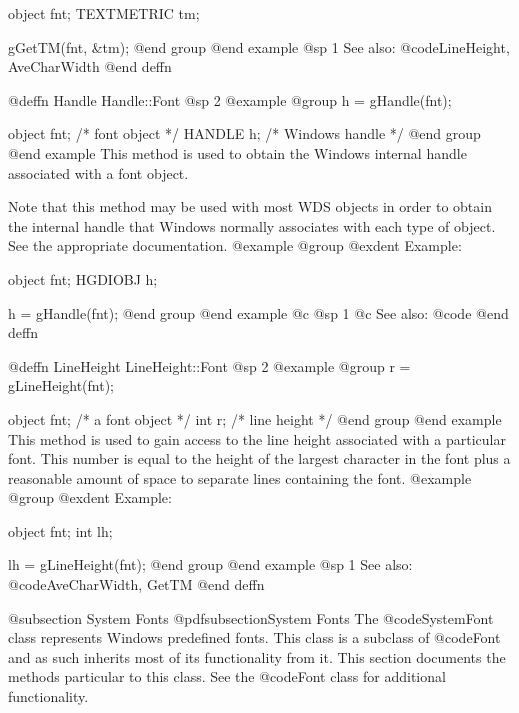 object  fnt;
TEXTMETRIC  tm;

gGetTM(fnt, &tm);
@end group
@end example
@sp 1
See also:  @code{LineHeight, AveCharWidth}
@end deffn













@deffn {Handle} Handle::Font
@sp 2
@example
@group
h = gHandle(fnt);

object  fnt;    /*  font object     */
HANDLE  h;      /*  Windows handle  */
@end group
@end example
This method is used to obtain the Windows internal handle associated with
a font object.  

Note that this method may be used with most WDS objects in order to obtain
the internal handle that Windows normally associates with each type of object.
See the appropriate documentation.
@example
@group
@exdent Example:

object  fnt;
HGDIOBJ h;

h = gHandle(fnt);
@end group
@end example
@c @sp 1
@c See also:  @code{}
@end deffn














@deffn {LineHeight} LineHeight::Font
@sp 2
@example
@group
r = gLineHeight(fnt);

object   fnt;  /*  a font object  */
int      r;    /*  line height    */
@end group
@end example
This method is used to gain access to the line height associated with
a particular font.  This number is equal to the height of the largest
character in the font plus a reasonable amount of space to separate
lines containing the font.
@example
@group
@exdent Example:

object  fnt;
int     lh;

lh = gLineHeight(fnt);
@end group
@end example
@sp 1
See also:  @code{AveCharWidth, GetTM}
@end deffn










@subsection System Fonts
@pdfsubsection{System Fonts}
The @code{SystemFont} class represents Windows predefined fonts.
This class is a subclass of @code{Font} and as such inherits most
of its functionality from it.  This section documents the methods
particular to this class.  See the @code{Font} class for additional
functionality.








